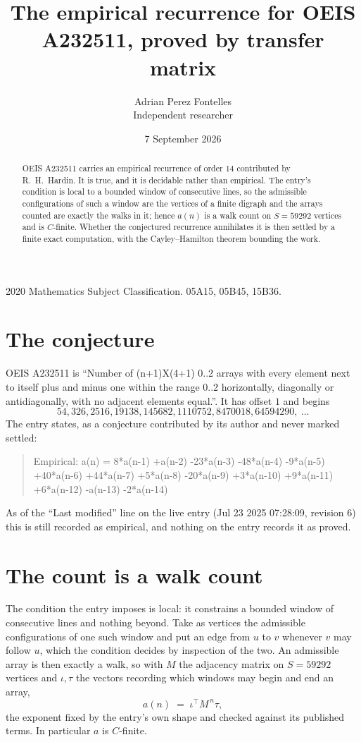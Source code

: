 \documentclass[11pt,a4paper]{article}
\title{The empirical recurrence for OEIS A232511, proved by transfer matrix}
\author{Adrian Perez Fontelles\\ \small Independent researcher}
\date{7 September 2026}
\theoremstyle{plain}
\theoremstyle{definition}
\begin{document}
\maketitle

\begin{abstract}
OEIS A232511 carries an empirical recurrence of order $14$ contributed by R.~H.~Hardin. It is
true, and it is decidable rather than empirical. The entry's condition is local to a bounded window of consecutive lines, so
the admissible configurations of such a window are the vertices of a finite digraph and the
arrays counted are exactly the walks in it; hence $a(n)$ is a walk count on $S=59292$ vertices
and is $C$-finite. Whether the conjectured recurrence annihilates it is then settled by a
finite exact computation, with the Cayley--Hamilton theorem bounding the work.
\end{abstract}

\noindent\small 2020 Mathematics Subject Classification. 05A15, 05B45, 15B36.\normalsize

\section{The conjecture}

OEIS A232511 is ``Number of (n+1)X(4+1) 0..2 arrays with every element next to itself plus and minus one within the range 0..2 horizontally, diagonally or antidiagonally, with no adjacent elements equal.''. It has offset $1$ and begins
\[
54, 326, 2516, 19138, 145682, 1110752, 8470018, 64594290,\ \dots
\]
The entry states, as a conjecture contributed by its author and never marked settled:
\begin{quote}
Empirical: a(n) = 8*a(n-1) +a(n-2) -23*a(n-3) -48*a(n-4) -9*a(n-5) +40*a(n-6) +44*a(n-7) +5*a(n-8) -20*a(n-9) +3*a(n-10) +9*a(n-11) +6*a(n-12) -a(n-13) -2*a(n-14)
\end{quote}
As of the ``Last modified'' line on the live entry (Jul 23 2025 07:28:09, revision 6) this is still
recorded as empirical, and nothing on the entry records it as proved.

\section{The count is a walk count}

The condition the entry imposes is local: it constrains a bounded window of consecutive lines and nothing beyond. Take as
vertices the admissible configurations of one such window and put an edge from $u$ to $v$
whenever $v$ may follow $u$, which the condition decides by inspection of the two. An
admissible array is then exactly a walk, so with $M$ the adjacency matrix on $S=59292$ vertices
and $\iota,\tau$ the vectors recording which windows may begin and end an array,
\[
a(n)\;=\;\iota^{\!\top}M^{\,n}\tau ,
\]
the exponent fixed by the entry's own shape and checked against its published terms. In
particular $a$ is $C$-finite.
\end{document}
